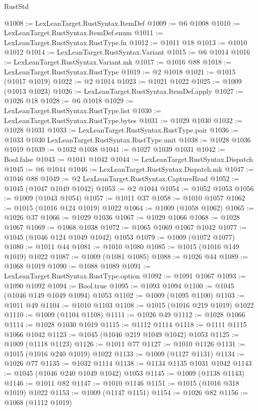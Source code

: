 \begin{lexlean}{RustStd}
\begin{coremodule}
@1008 := LexLeanTarget.RustSyntax.ItemDef
@1009 := @6 @1008
@1010 := LexLeanTarget.RustSyntax.ItemDef.enum
@1011 := LexLeanTarget.RustSyntax.RustType.fn
@1012 := @1011 @18
@1013 := @1010 @1012
@1014 := LexLeanTarget.RustSyntax.Variant
@1015 := @6 @1014
@1016 := LexLeanTarget.RustSyntax.Variant.mk
@1017 := @1016 @88
@1018 := LexLeanTarget.RustSyntax.RustType
@1019 := @2 @1018
@1021 := @1015 (@1017 @1019)
@1022 := @2 @1014
@1023 := @1021 @1022
@1025 := @1009 (@1013 @1023)
@1026 := LexLeanTarget.RustSyntax.ItemDef.apply
@1027 := @1026 @18
@1028 := @6 @1018
@1029 := LexLeanTarget.RustSyntax.RustType.list
@1030 := LexLeanTarget.RustSyntax.RustType.bytes
@1031 := @1029 @1030
@1032 := @1028 @1031
@1033 := LexLeanTarget.RustSyntax.RustType.pair
@1036 := @1033 @1030 LexLeanTarget.RustSyntax.RustType.unit
@1038 := @1028 @1036 @1019
@1039 := @1032 @1038
@1041 := @1027 @1039 @1031
@1042 := Bool.false
@1043 := @1041 @1042
@1044 := LexLeanTarget.RustSyntax.Dispatch
@1045 := @6 @1044
@1046 := LexLeanTarget.RustSyntax.Dispatch.mk
@1047 := @1046 @88
@1049 := @2 LexLeanTarget.RustSyntax.CaptureRead
@1052 := @1045 (@1047 @1049 @1042)
@1053 := @2 @1044
@1054 := @1052 @1053
@1056 := @1009 (@1043 @1054)
@1057 := @1011 @37
@1058 := @1010 @1057
@1062 := @1015 (@1016 @124 @1019) @1022
@1064 := @1009 (@1058 @1062)
@1065 := @1026 @37
@1066 := @1029 @1036
@1067 := @1029 @1066
@1068 := @1028 @1067
@1069 := @1068 @1038
@1072 := @1065 @1069 @1067 @1042
@1077 := @1045 (@1046 @124 @1049 @1042) @1053
@1079 := @1009 (@1072 @1077)
@1080 := @1011 @44
@1081 := @1010 @1080
@1085 := @1015 (@1016 @149 @1019) @1022
@1087 := @1009 (@1081 @1085)
@1088 := @1026 @44
@1089 := @1068 @1019
@1090 := @1088 @1089
@1091 := LexLeanTarget.RustSyntax.RustType.option
@1092 := @1091 @1067
@1093 := @1090 @1092
@1094 := Bool.true
@1095 := @1093 @1094
@1100 := @1045 (@1046 @149 @1049 @1094) @1053
@1102 := @1009 (@1095 @1100)
@1103 := @1011 @49
@1104 := @1010 @1103
@1108 := @1015 (@1016 @219 @1019) @1022
@1110 := @1009 (@1104 @1108)
@1111 := @1026 @49
@1112 := @1028 @1066
@1114 := @1028 @1030 @1019
@1115 := @1112 @1114
@1118 := @1111 @1115 @1066 @1042
@1123 := @1045 (@1046 @219 @1049 @1042) @1053
@1125 := @1009 (@1118 @1123)
@1126 := @1011 @77
@1127 := @1010 @1126
@1131 := @1015 (@1016 @240 @1019) @1022
@1133 := @1009 (@1127 @1131)
@1134 := @1026 @77
@1135 := @1032 @1114
@1138 := @1134 @1135 @1031 @1042
@1143 := @1045 (@1046 @240 @1049 @1042) @1053
@1145 := @1009 (@1138 @1143)
@1146 := @1011 @82
@1147 := @1010 @1146
@1151 := @1015 (@1016 @318 @1019) @1022
@1153 := @1009 (@1147 @1151)
@1154 := @1026 @82
@1156 := @1068 (@1112 @1019)

\end{coremodule}
\end{lexlean}

